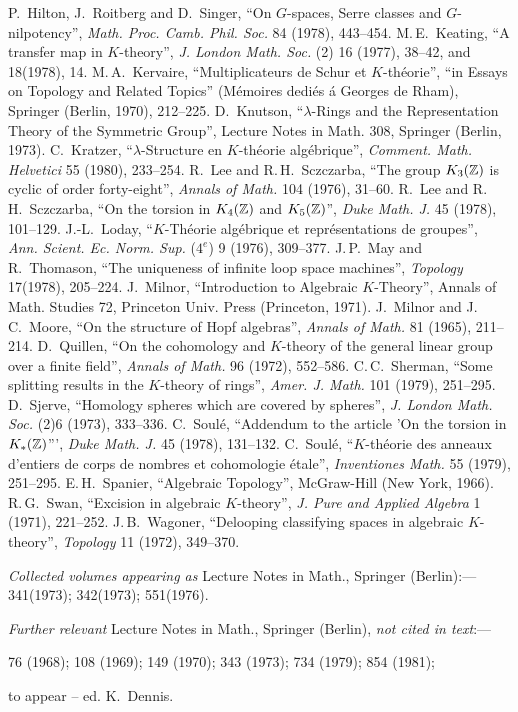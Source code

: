 \begin{thebibliography}{99}
 P.~Hilton, J.~Roitberg and D.~Singer, ``On $G$-spaces, Serre classes and $G$-nilpotency'', {\em Math. Proc. Camb. Phil. Soc.} 84 (1978), 443--454.
 M.\,E.~Keating, ``A transfer map in $K$-theory'', {\em J. London Math. Soc.} (2) 16 (1977), 38--42, and 18(1978), 14.
 M.\,A.~Kervaire, ``Multiplicateurs de Schur et $K$-th\'{e}orie'', ``in Essays on Topology and Related Topics'' (M\'{e}moires dedi\'{e}s \'{a} Georges de Rham), Springer (Berlin, 1970), 212--225.
 D.~Knutson, ``$\lambda$-Rings and the Representation Theory of the Symmetric Group'',
Lecture Notes in Math. 308, Springer (Berlin, 1973).
 C.~Kratzer, ``$\lambda$-Structure en $K$-th\'{e}orie alg\'{e}brique'', {\em Comment. Math. Helvetici} 55 (1980), 233--254.
 R.~Lee and R.\,H.~Sczczarba, ``The group $K_3(\mathbb{Z})$ is cyclic of order forty-eight'', {\em Annals of Math.} 104 (1976), 31--60.
 R.~Lee and R.\,H.~Sczczarba, ``On the torsion in $K_4(\mathbb{Z})$ and $K_5(\mathbb{Z})$'', {\em Duke Math. J.} 45 (1978), 101--129.
 J.-L.~Loday, ``$K$-Th\'{e}orie alg\'{e}brique et repr\'{e}sentations de groupes'', {\em Ann. Scient. Ec. Norm. Sup.} ($4^e$) 9 (1976), 309--377.
 J.\,P.~May and R.~Thomason, ``The uniqueness of infinite loop space machines'', {\em Topology} 17(1978), 205--224.
 J.~Milnor, ``Introduction to Algebraic $K$-Theory'', Annals of Math. Studies 72, Princeton Univ. Press (Princeton, 1971).
 J.~Milnor and J.\,C.~Moore, ``On the structure of Hopf algebras'', {\em Annals of Math.} 81 (1965), 211--214.
 D.~Quillen, ``On the cohomology and $K$-theory of the general linear group over a finite field'', {\em Annals of Math.} 96 (1972), 552--586.
 C.\,C.~Sherman, ``Some splitting results in the $K$-theory of rings'', {\em Amer. J. Math.} 101 (1979), 251--295.
 D.~Sjerve, ``Homology spheres which are covered by spheres'', {\em J. London Math. Soc.} (2)6 (1973), 333--336.
  C.~Soul\'{e}, ``Addendum to the article 'On the torsion in $K_*(\mathbb{Z})$''', {\em Duke Math. J.} 45 (1978), 131--132.
  C.~Soul\'{e}, ``$K$-th\'{e}orie des anneaux d'entiers de corps de nombres et cohomologie \'{e}tale'', {\em Inventiones Math.} 55 (1979), 251--295.
 E.\,H.~Spanier, ``Algebraic Topology'', McGraw-Hill (New York, 1966).
 R.\,G.~Swan, ``Excision in algebraic $K$-theory'', {\em J. Pure and Applied Algebra} 1 (1971), 221--252.
 J.\,B.~Wagoner, ``Delooping classifying spaces in algebraic $K$-theory'', {\em Topology} 11 (1972), 349--370.

{\em Collected volumes appearing as}  Lecture Notes in Math., Springer (Berlin):---
 341(1973);
 342(1973);
 551(1976).

{\em Further relevant} Lecture Notes in Math., Springer (Berlin), {\em not cited in text}:---

76 (1968); 108 (1969); 149 (1970); 343 (1973); 734 (1979); 854 (1981); 

to appear -- ed. K.~Dennis.
\end{thebibliography}